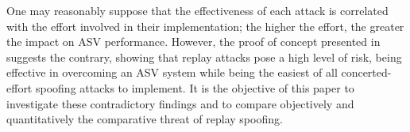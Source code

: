 One may reasonably suppose that the effectiveness of each attack is correlated with the effort involved in their implementation; the higher the effort, the greater the impact on ASV performance. However, the proof of concept presented in~\cite{Alegre2014} suggests the contrary, showing that replay attacks pose a high level of risk, being effective in overcoming an ASV system while being the easiest of all concerted-effort spoofing attacks to implement.  It is the objective of this paper to investigate these contradictory findings and to compare objectively and quantitatively the comparative threat of replay spoofing.


